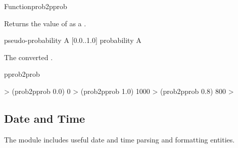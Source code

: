 \documentclass[10pt,twoside,english,pdftex]{article}
\begin{document}

\begin{functiondoc}{Function}{prob2pprob}%
  { \returns{} }
%
%

\fnsyntax

\fnpurpose Returns the value of  as a
.

\fnpackage {}

\fnmodule {}

\fnargs
\begin{args}{pseudo-probability}
\arg[probability] A [0.0..1.0] probability
 A  
\end{args}

\fnreturns The converted .

\begin{alsos}{pprob2prob}
\end{alsos}

\fnexamples
\begin{example}
%
\W\supp
  > (prob2pprob 0.0)
  0
  > (prob2pprob 1.0)
  1000
  > (prob2pprob 0.8)
  800
  > 
\end{example}

\end{functiondoc}


\T\markright{}%
\T\pagestyle{plain}
\T\clearpage
\W{}
\T\pagestyle{fancy}
\T\thispagestyle{fancybottom}
\T\global\def\fnlastname{ }%

\subsection{Date and Time}
\label{sec:dateandtime}%

%
The  module includes useful date and
time parsing and formatting entities.
\end{document}
